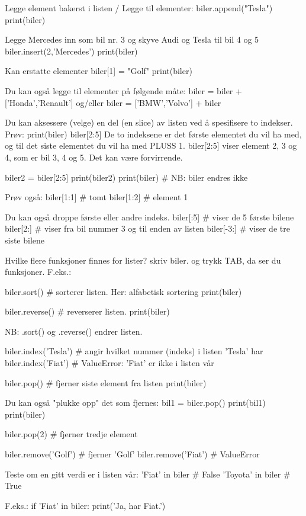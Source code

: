 Legge element bakerst i listen / Legge til elementer: 
biler.append("Tesla")
print(biler)

Legge Mercedes inn som bil nr. 3 og skyve Audi og Tesla til bil 4 og 5 
biler.insert(2,'Mercedes')
print(biler)

Kan erstatte elementer
biler[1] = "Golf"
print(biler)

Du kan også legge til elementer på følgende måte:
biler = biler + ['Honda','Renault']
og/eller 
biler = ['BMW','Volvo'] + biler


Du kan aksessere (velge) en del (en slice) av listen ved å spesifisere to indekser.
Prøv: 
print(biler)
biler[2:5]
De to indeksene er det første elementet du vil ha med,
og til det siste elementet du vil ha med PLUSS 1. 
biler[2:5] viser element 2, 3 og 4, som er bil 3, 4 og 5. 
Det kan være forvirrende. 

biler2 = biler[2:5] 
print(biler2)
print(biler)          # NB: biler endres ikke 

Prøv også: 
biler[1:1]   # tomt
biler[1:2]   # element 1


Du kan også droppe første eller andre indeks.
biler[:5]     # viser de 5 første bilene
biler[2:]     # viser fra bil nummer 3 og til enden av listen
biler[-3:]    # viser de tre siste bilene


Hvilke flere funksjoner finnes for lister?
skriv biler. og trykk TAB, da ser du funksjoner. 
F.eks.:

biler.sort()          # sorterer listen. Her: alfabetisk sortering
print(biler)

biler.reverse()       # reverserer listen. 
print(biler)

NB: .sort() og .reverse() endrer listen. 

biler.index('Tesla')  # angir hvilket nummer (indeks) i listen 'Tesla' har 
biler.index('Fiat')   # ValueError: 'Fiat' er ikke i listen vår 

biler.pop()           # fjerner siste element fra listen
print(biler)


Du kan også "plukke opp" det som fjernes:
bil1 = biler.pop()
print(bil1)
print(biler)

biler.pop(2)          # fjerner tredje element 

biler.remove('Golf')  # fjerner 'Golf'
biler.remove('Fiat')  # ValueError

Teste om en gitt verdi er i listen vår:
'Fiat' in biler       # False
'Toyota' in biler     # True

F.eks.:
if 'Fiat' in biler:
   print('Ja, har Fiat.')






